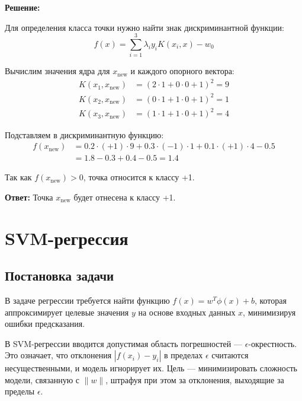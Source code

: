 \textbf{Решение:}
\par Для определения класса точки нужно найти знак дискриминантной функции:
\begin{equation*}
    f(x) = \sum_{i=1}^3 \lambda_i y_i K(x_i,x) - w_0
\end{equation*}

\par Вычислим значения ядра для \(x_{\text{new}}\) и каждого опорного вектора:
\begin{align*}
    K(x_1,x_{\text{new}}) &= (2 \cdot 1 + 0 \cdot 0 + 1)^2 = 9 \\
    K(x_2,x_{\text{new}}) &= (0 \cdot 1 + 1 \cdot 0 + 1)^2 = 1 \\
    K(x_3,x_{\text{new}}) &= (1 \cdot 1 + 1 \cdot 0 + 1)^2 = 4
\end{align*}

\par Подставляем в дискриминантную функцию:
\begin{align*}
    f(x_{\text{new}}) &= 0.2 \cdot (+1) \cdot 9 + 0.3 \cdot (-1) \cdot 1 + 0.1 \cdot (+1) \cdot 4 - 0.5 \\
    &= 1.8 - 0.3 + 0.4 - 0.5 = 1.4
\end{align*}

\par Так как \(f(x_{\text{new}}) > 0\), точка относится к классу +1.

\textbf{Ответ:} Точка \(x_{\text{new}}\) будет отнесена к классу +1.

\section{SVM-регрессия}
\subsection{Постановка задачи}
\par В задаче регрессии требуется найти функцию \( f(x) = w^T \phi(x) + b \), которая аппроксимирует целевые значения \( y \) на основе входных данных \( x \), минимизируя ошибки предсказания.
\par В SVM-регрессии вводится допустимая область погрешностей — \(\epsilon\)-окрестность. Это означает, что отклонения \( |f(x_i) - y_i| \) в пределах \(\epsilon\) считаются несущественными, и модель игнорирует их. Цель — минимизировать сложность модели, связанную с \(\|w\|\), штрафуя при этом за отклонения, выходящие за пределы \(\epsilon\).

